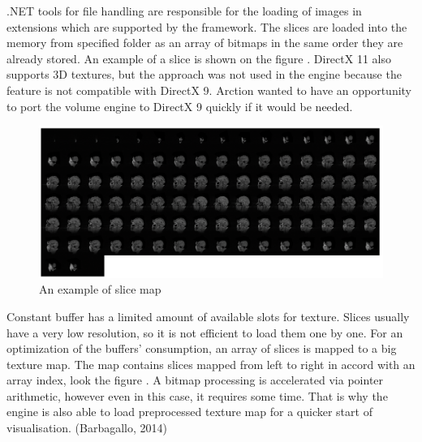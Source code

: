 \documentclass[twoside, english, 11pt]{report}
\begin{document}
.NET tools for file handling are responsible for the loading of images in extensions which are supported by the framework. The slices are loaded into the memory from specified folder as an array of bitmaps in the same order they are already stored. An example of a slice is shown on the figure \label{fig:slice}. DirectX 11 also supports 3D textures, but the approach was not used in the engine because the feature is not compatible with DirectX 9. Arction wanted to have an opportunity to port the volume engine to DirectX 9 quickly if it would be needed. \\

\begin{figure}[!h]
\centerline{\includegraphics[scale = 0.33]{img/map}}
\caption{An example of slice map\label{fig:map}}
\end{figure}
Constant buffer has a limited amount of available slots for texture. Slices usually have a very low resolution, so it is not efficient to load them one by one. For an optimization of the buffers' consumption, an array of slices is mapped to a big texture map. The map contains slices mapped from left to right in accord with an array index, look the figure \label{fig:map}. A bitmap processing is accelerated via pointer arithmetic, however even in this case, it requires some time. That is why the engine is also able to load preprocessed texture map for a quicker start of visualisation. (Barbagallo, 2014) \\
\end{document}

